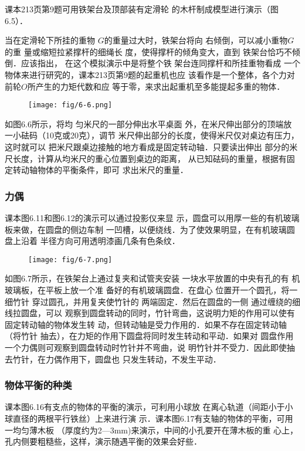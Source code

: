 课本213页第9题可用铁架台及顶部装有定滑轮
的木杆制成模型进行演示（图6.5）．


当在定滑轮下所挂的重物
$G$的重量过大时，铁架台将向
右倾倒，可以减小重物$G$的重
量或缩短拉紧撑杆的细绳长
度，使得撑杆的倾角变大，直到
铁架台恰巧不倾倒．应该指出，
在这个模拟演示中是将整个铁
架台连同撑杆和所挂重物看成
一个物体来进行研究的，课本213页第9题的起重机也应
该看作是一个整体，各个力对前轮$O$所产生的力矩代数和应
等于零，来求出起重机至多能提起多重的物体．

\begin{figure}[htp]
    \centering
    \texttt{[image: fig/6-6.png]}
    \caption{}
\end{figure}

如图6.6所示，将均
匀米尺的一部分伸出水平桌面
外，在米尺伸出部分的顶端放
一小砝码（10克或20克），调节
米尺伸出部分的长度，使得米尺仅对桌边有压力，这时就可以
把米尺跟桌边接触的地方看成是固定转动轴．只要读出伸出
部分的米尺长度，计算从均米尺的重心位置到桌边的距离，
从已知砝码的重量，根据有固定转动轴物体的平衡条件，即可
求出米尺的重量．

\subsubsection{力偶}
课本图6.11和图6.12的演示可以通过投影仪来显
示，圆盘可以用厚一些的有机玻璃板来做，在圆盘的侧边车制
一凹槽，以便绕线．为了使效果明显，在有机玻璃圆盘上沿着
半径方向可用透明漆画几条有色条纹．

\begin{figure}[htp]
    \centering
    \texttt{[image: fig/6-7.png]}
    \caption{}
\end{figure}

如图6.7所示，在铁架台上通过复夹和试管夹安装
一块水平放置的中央有孔的有
机玻璃板，在平板上放一个准
备好的有机玻璃圆盘．在盘心
位置开一个圆孔，将一细竹针
穿过圆孔，并用复夹使竹针的
两端固定．然后在圆盘的一侧
通过缠绕的细线拉圆盘，可以
观察到圆盘转动的同时，竹针弯曲，这说明力矩的作用可以使有固定转动轴的物体发生转
动，但转动轴是受力作用的．如果不存在固定转动轴（将竹针
抽去），在力矩的作用下圆盘将同时发生转动和平动．如果对
圆盘作用一个力偶则可观察到圆盘转动时竹针并不弯曲，说
明竹针并不受力．因此即使抽去竹针，在力偶作用下，圆盘也
只发生转动，不发生平动．

\subsubsection{物体平衡的种类}
课本图6.16有支点的物体的平衡的演示，可利用小球放
在离心轨道（间距小于小球直径的两根平行铁丝）上来进行演
示．课本图6.17有支轴的物体的平衡，可用一均匀薄木板
（厚度约为2—3mm)来演示，中间的小孔要开在薄木板的重
心上，孔内侧要粗糙些，这样，演示随遇平衡的效果会好些．


